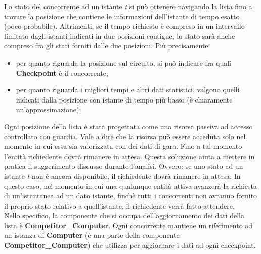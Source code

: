      Lo stato del concorrente ad un istante \emph{t} si può ottenere navigando
la lista fino a trovare la posizione che contiene le informazioni
     dell'istante di tempo esatto (poco probabile). Altrimenti, se il tempo
richiesto è compreso in un intervallo limitato dagli istanti
     indicati in due posizioni contigue, lo stato sarà anche compreso fra gli
stati forniti dalle due posizioni. Più precisamente:\\
     \begin{itemize}
     \item per quanto riguarda la posizione sul circuito, si può indicare fra
quali \textbf{Checkpoint} è il concorrente;
     \item per quanto riguarda i migliori tempi e altri dati statistici, valgono
quelli indicati dalla posizione con istante di tempo più basso (è chiaramente
     un'approssimazione);
     \end{itemize}
     Ogni posizione della lista è stata progettata come una risorsa passiva ad
accesso controllato con guardia. Vale a dire che la risorsa può
     essere acceduta solo nel momento in cui essa sia valorizzata con dei dati
di gara. Fino a tal momento l'entità richiedente dovrà rimanere
     in attesa. Questa soluzione aiuta a mettere in pratica il suggerimento
discusso durante l'analisi. Ovvero: se uno stato ad un istante
     \emph{t} non è ancora disponibile, il richiedente dovrà rimanere in attesa.
In questo caso, nel momento in cui una qualunque entità attiva
     avanzerà la richiesta di un'istantanea ad un dato istante, finchè tutti i
concorrenti non avranno fornito il proprio stato relativo 
     a quell'istante, il richiedente verrà fatto attendere.\\
     Nello specifico, la componente che si occupa dell'aggiornamento dei dati
della lista è \textbf{Competitor\_Computer}. Ogni concorrente
     mantiene un riferimento ad un istanza di \textbf{Computer} (è una parte
della componente \textbf{Competitor\_Computer}) 
     che utilizza per aggiornare i dati ad ogni checkpoint.
